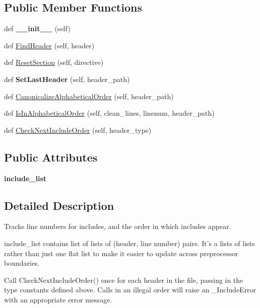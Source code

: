 \subsection*{Public Member Functions}
\begin{DoxyCompactItemize}
\item 
def {\bfseries \+\_\+\+\_\+init\+\_\+\+\_\+} (self)\hypertarget{classcpplint_1_1__IncludeState_a4d3ae4ee2a38efc25cce07e3e8484ba4}{}\label{classcpplint_1_1__IncludeState_a4d3ae4ee2a38efc25cce07e3e8484ba4}

\item 
def \hyperlink{classcpplint_1_1__IncludeState_a9bddbf581fc7a4c3c0258eaa42b94c3a}{Find\+Header} (self, header)
\item 
def \hyperlink{classcpplint_1_1__IncludeState_a31551f83fcc626e7babb1581a486b6fa}{Reset\+Section} (self, directive)
\item 
def {\bfseries Set\+Last\+Header} (self, header\+\_\+path)\hypertarget{classcpplint_1_1__IncludeState_a9bc1ada2060a49628c1fffa973b57df1}{}\label{classcpplint_1_1__IncludeState_a9bc1ada2060a49628c1fffa973b57df1}

\item 
def \hyperlink{classcpplint_1_1__IncludeState_ae69c652befa2d160194c0a02ff0c7d48}{Canonicalize\+Alphabetical\+Order} (self, header\+\_\+path)
\item 
def \hyperlink{classcpplint_1_1__IncludeState_abfda27324121ab0bf9d29866d975274b}{Is\+In\+Alphabetical\+Order} (self, clean\+\_\+lines, linenum, header\+\_\+path)
\item 
def \hyperlink{classcpplint_1_1__IncludeState_a80f82f17565e8412e7e5bbe52b464f18}{Check\+Next\+Include\+Order} (self, header\+\_\+type)
\end{DoxyCompactItemize}
\subsection*{Public Attributes}
\begin{DoxyCompactItemize}
\item 
{\bfseries include\+\_\+list}\hypertarget{classcpplint_1_1__IncludeState_a82d8b92a431437ee181e950517c71cbb}{}\label{classcpplint_1_1__IncludeState_a82d8b92a431437ee181e950517c71cbb}

\end{DoxyCompactItemize}


\subsection{Detailed Description}
\begin{DoxyVerb}Tracks line numbers for includes, and the order in which includes appear.

include_list contains list of lists of (header, line number) pairs.
It's a lists of lists rather than just one flat list to make it
easier to update across preprocessor boundaries.

Call CheckNextIncludeOrder() once for each header in the file, passing
in the type constants defined above. Calls in an illegal order will
raise an _IncludeError with an appropriate error message.\end{DoxyVerb}
 

